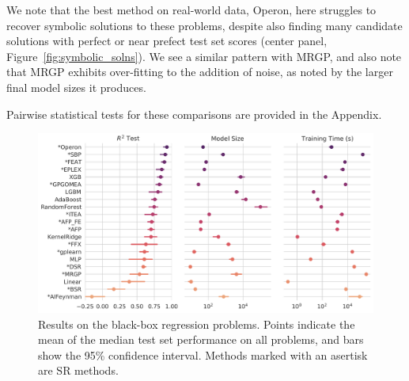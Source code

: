 We note that the best method on real-world data, Operon, here struggles to recover symbolic solutions to these problems, despite also finding many candidate solutions with perfect or near prefect test set scores (center panel, Figure~\ref{fig:symbolic_solns}). 
We see a similar pattern with MRGP, and also note that MRGP exhibits over-fitting to the addition of noise, as noted by the larger final model sizes it produces. 

Pairwise statistical tests for these comparisons are provided in the Appendix.

\begin{figure}
    \includegraphics[width=\textwidth]{figs/results_pmlb_r1/pairgrid-pointplot_r2_test_model_size_training-time-(s).pdf}
    \caption{ 
        Results on the black-box regression problems.
        Points indicate the mean of the median test set performance on all problems, and bars show the 95\% confidence interval. 
        Methods marked with an asertisk are SR methods. 
    }
    \label{fig:pmlb_perf}
\end{figure}


